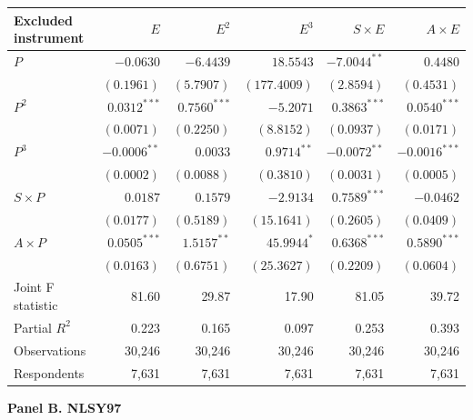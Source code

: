 \documentclass[10pt,letterpaper]{article}
\begin{document}
\noindent\begin{tabular*}{\textwidth}{@{\extracolsep{\fill}}lrrrrr@{}}
\toprule
Excluded instrument & $E$ & $E^2$ & $E^3$ & $S\times E$ & $A\times E$ \\
\midrule
$P$ & $-0.0630$ & $-6.4439$ & $18.5543$ & $-7.0044^{**}$ & $0.4480$ \\
 & $(0.1961)$ & $(5.7907)$ & $(177.4009)$ & $(2.8594)$ & $(0.4531)$ \\[2pt]
$P^2$ & $0.0312^{***}$ & $0.7560^{***}$ & $-5.2071$ & $0.3863^{***}$ & $0.0540^{***}$ \\
 & $(0.0071)$ & $(0.2250)$ & $(8.8152)$ & $(0.0937)$ & $(0.0171)$ \\[2pt]
$P^3$ & $-0.0006^{**}$ & $0.0033$ & $0.9714^{**}$ & $-0.0072^{**}$ & $-0.0016^{***}$ \\
 & $(0.0002)$ & $(0.0088)$ & $(0.3810)$ & $(0.0031)$ & $(0.0005)$ \\[2pt]
$S\times P$ & $0.0187$ & $0.1579$ & $-2.9134$ & $0.7589^{***}$ & $-0.0462$ \\
 & $(0.0177)$ & $(0.5189)$ & $(15.1641)$ & $(0.2605)$ & $(0.0409)$ \\[2pt]
$A\times P$ & $0.0505^{***}$ & $1.5157^{**}$ & $45.9944^{*}$ & $0.6368^{***}$ & $0.5890^{***}$ \\
 & $(0.0163)$ & $(0.6751)$ & $(25.3627)$ & $(0.2209)$ & $(0.0604)$ \\[2pt]
\midrule
Joint F statistic & 81.60 & 29.87 & 17.90 & 81.05 & 39.72 \\
Partial $R^2$ & 0.223 & 0.165 & 0.097 & 0.253 & 0.393 \\
Observations & 30,246 & 30,246 & 30,246 & 30,246 & 30,246 \\
Respondents & 7,631 & 7,631 & 7,631 & 7,631 & 7,631 \\
\bottomrule
\end{tabular*}\par\smallskip
\medskip
\noindent\textbf{Panel B. NLSY97}\par\smallskip
\end{document}
